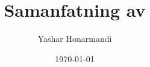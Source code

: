 \documentclass[a4paper, 11pt]{article}
\title{Samanfatning av}
\author{Yashar Honarmandi}
\date{\today}
\begin{document}
\sloppy

\maketitle

\begin{abstract}
	
\end{abstract}

\thispagestyle{empty}

\newpage

\tableofcontents

\newpage


\twocolumn
\end{document}

